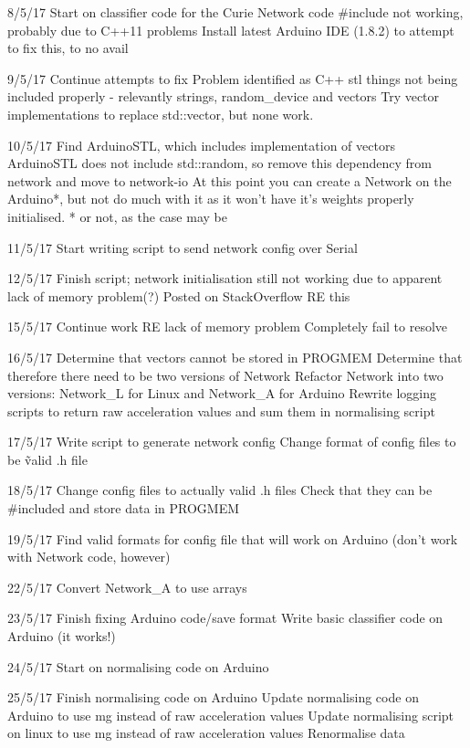 \documentclass[a4paper]{article}
\begin{document}
8/5/17
    Start on classifier code for the Curie
        Network code \#include not working, probably due to C++11 problems
    Install latest Arduino IDE (1.8.2) to attempt to fix this, to no avail

9/5/17
    Continue attempts to fix
    Problem identified as C++ stl things not being included properly - relevantly strings, random\_device and vectors
    Try vector implementations to replace std::vector, but none work.

10/5/17
    Find ArduinoSTL, which includes implementation of vectors
    ArduinoSTL does not include std::random, so remove this dependency from network and move to network-io
    At this point you can create a Network on the Arduino*, but not do much with it as it won't have it's weights properly initialised.
        * or not, as the case may be

11/5/17
    Start writing script to send network config over Serial

12/5/17
    Finish script; network initialisation still not working due to apparent lack of memory problem(?)
        Posted on StackOverflow RE this

15/5/17
    Continue work RE lack of memory problem
    Completely fail to resolve

16/5/17
    Determine that vectors cannot be stored in PROGMEM
    Determine that therefore there need to be two versions of Network
    Refactor Network into two versions: Network\_L for Linux and Network\_A for Arduino
    Rewrite logging scripts to return raw acceleration values and sum them in normalising script

17/5/17
    Write script to generate network config
    Change format of config files to be \~valid .h file

18/5/17
    Change config files to actually valid .h files 
    Check that they can be \#included and store data in PROGMEM

19/5/17
    Find valid formats for config file that will work on Arduino
        (don't work with Network code, however)

22/5/17
    Convert Network\_A to use arrays
     
23/5/17
    Finish fixing Arduino code/save format
    Write basic classifier code on Arduino (it works!)

24/5/17
    Start on normalising code on Arduino

25/5/17
    Finish normalising code on Arduino
    Update normalising code on Arduino to use mg instead of raw acceleration values
    Update normalising script on linux to use mg instead of raw acceleration values
    Renormalise data
\end{document}
